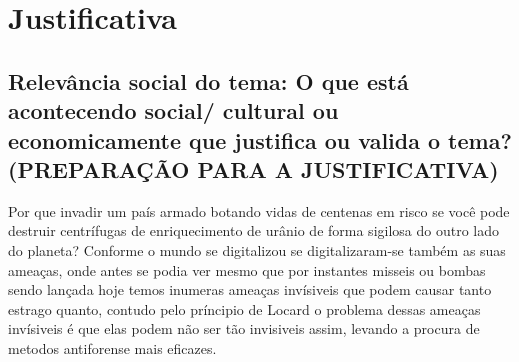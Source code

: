\section{Justificativa}

\subsection{Relevância social  do tema: O que está acontecendo social/ cultural ou economicamente que justifica ou valida o tema? (PREPARAÇÃO PARA A JUSTIFICATIVA)}

Por que invadir um país armado botando vidas de centenas em risco se você pode destruir centrífugas de enriquecimento de urânio de forma sigilosa do outro lado do planeta? Conforme o mundo se digitalizou se digitalizaram-se também as suas ameaças, onde antes se podia ver mesmo que por instantes misseis ou bombas sendo lançada hoje temos inumeras ameaças invísiveis que podem causar tanto estrago quanto, contudo pelo príncipio de Locard o problema dessas ameaças invísiveis é que elas podem não ser tão invisiveis assim, levando a procura de metodos antiforense mais eficazes.



